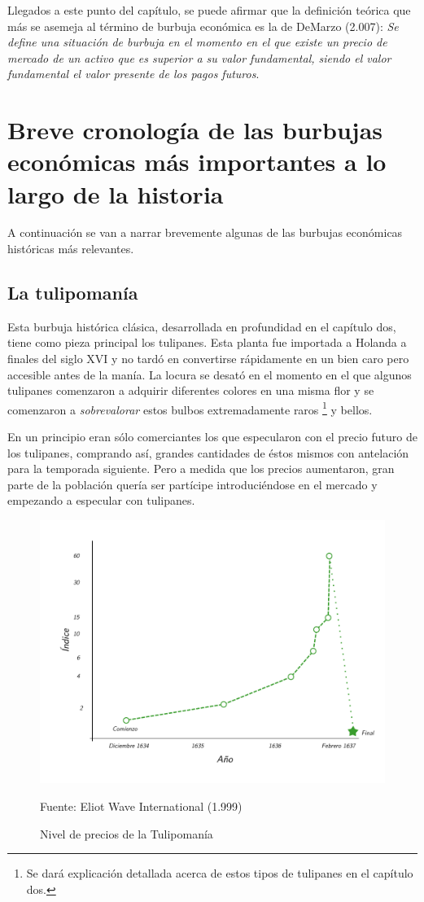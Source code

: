 Llegados a este punto del capítulo, se puede afirmar que la definición teórica que más se asemeja al término de burbuja económica es la de DeMarzo (2.007): \emph{Se define una situación de burbuja en el momento en el que existe un precio de mercado de un activo que es superior a su valor fundamental, siendo el valor fundamental el valor presente de los pagos futuros}. 

\section{Breve cronología de las burbujas económicas más importantes a lo largo de la historia} 
A continuación se van a narrar brevemente algunas de las burbujas económicas históricas más relevantes.
\subsection{La tulipomanía} 
Esta burbuja histórica clásica, desarrollada en profundidad en el capítulo dos, tiene como pieza principal los tulipanes. Esta planta fue importada a Holanda a finales del siglo XVI y no tardó en convertirse rápidamente en un bien caro pero accesible antes de la manía. La locura se desató en el momento en el que algunos tulipanes comenzaron a adquirir diferentes colores en una misma flor y se comenzaron a \emph{sobrevalorar} estos bulbos extremadamente raros \footnote{Se dará explicación detallada acerca de estos tipos de tulipanes en el capítulo dos.} y bellos.

En un principio eran sólo comerciantes los que especularon con el precio futuro de los tulipanes, comprando así, grandes cantidades de éstos mismos con antelación para la temporada siguiente. Pero a medida que los precios aumentaron, gran parte de la población quería ser partícipe introduciéndose en el mercado y empezando a especular con tulipanes. 

\begin{figure}[!h] 
\caption{Nivel de precios de la Tulipomanía} 
\centering \includegraphics[width=150mm]{capitulos/graficos/TulipBubble} 
\label{fig:Nivel de precios de la Tulipomanía} 

	\footnotesize
	Fuente: Eliot Wave International (1.999)

\end{figure}

